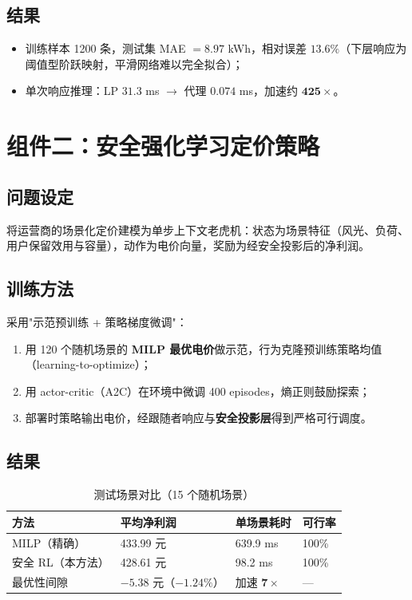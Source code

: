 \documentclass[UTF8,a4paper,11pt]{ctexart}
\begin{document}
\subsection{结果}
\begin{itemize}
  \item 训练样本 1200 条，测试集 MAE $=8.97$ kWh，相对误差 $13.6\%$（下层响应为阈值型阶跃映射，平滑网络难以完全拟合）；
  \item 单次响应推理：LP $31.3$ ms $\to$ 代理 $0.074$ ms，加速约 $\mathbf{425\times}$。
\end{itemize}

\section{组件二：安全强化学习定价策略}

\subsection{问题设定}
将运营商的场景化定价建模为单步上下文老虎机：状态为场景特征（风光、负荷、用户保留效用与容量），动作为电价向量，奖励为经安全投影后的净利润。

\subsection{训练方法}
采用"示范预训练 + 策略梯度微调"：
\begin{enumerate}
  \item 用 120 个随机场景的 \textbf{MILP 最优电价}做示范，行为克隆预训练策略均值（learning-to-optimize）；
  \item 用 actor-critic（A2C）在环境中微调 400 episodes，熵正则鼓励探索；
  \item 部署时策略输出电价，经跟随者响应与\textbf{安全投影层}得到严格可行调度。
\end{enumerate}

\subsection{结果}
\begin{table}[htbp]
\centering
\small
\caption{测试场景对比（15 个随机场景）}
\begin{tabular}{p{4.2cm} p{3.6cm} p{3.6cm} p{2.8cm}}
\toprule
\textbf{方法} & \textbf{平均净利润} & \textbf{单场景耗时} & \textbf{可行率}\\
\midrule
MILP（精确） & 433.99 元 & 639.9 ms & 100\%\\
安全 RL（本方法） & 428.61 元 & 98.2 ms & 100\%\\
\midrule
最优性间隙 & $-5.38$ 元（$-1.24\%$） & 加速 $\mathbf{7\times}$ & ---\\
\bottomrule
\end{tabular}
\end{table}
\end{document}
